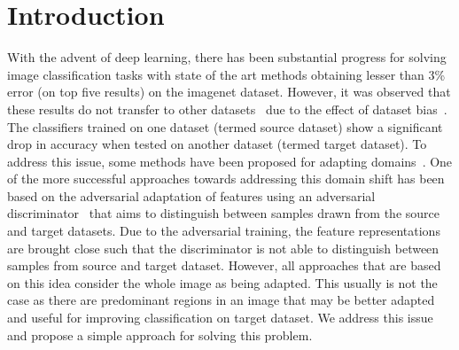 \documentclass[10pt,twocolumn,letterpaper]{article}
\begin{document}
\section{Introduction}
With the advent of deep learning, there has been substantial progress for solving image classification tasks with state of the art methods obtaining lesser than 3\% error (on top five results) on the imagenet dataset. However, it was observed that these results do not transfer to other datasets~\cite{long_ICML2015} due to the effect of dataset bias~\cite{torralba_CVPR2011}. The classifiers trained on one dataset (termed source dataset) show a significant drop in accuracy when tested on another dataset (termed target dataset). To address this issue, some methods have been proposed for adapting domains~\cite{csurka2017domain,wang2018deep}. One of the more successful approaches towards addressing this domain shift has been based on the adversarial adaptation of features using an adversarial discriminator~\cite{ganin_ICML2015} that aims to distinguish between samples drawn from the source and target datasets. Due to the adversarial training, the feature representations are brought close such that the discriminator is not able to distinguish between samples from source and target dataset. However, all approaches that are based on this idea consider the whole image as being adapted. This usually is not the case as there are predominant regions in an image that may be better adapted and useful for improving classification on target dataset. We address this issue and propose a simple approach for solving this problem.
\end{document}
